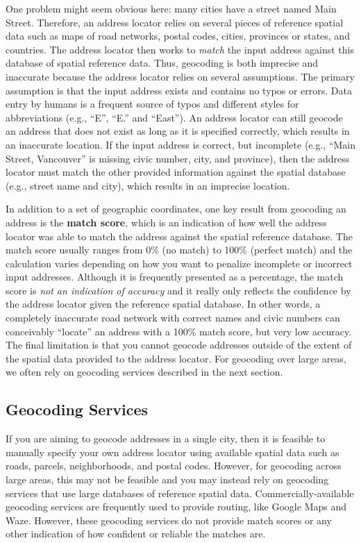 \documentclass[
]{book}
\begin{document}
One problem might seem obvious here: many cities have a street named Main Street. Therefore, an address locator relies on several pieces of reference spatial data such as maps of road networks, postal codes, cities, provinces or states, and countries. The address locator then works to \emph{match} the input address against this database of spatial reference data. Thus, geocoding is both imprecise and inaccurate because the address locator relies on several assumptions. The primary assumption is that the input address exists and contains no typos or errors. Data entry by humans is a frequent source of typos and different styles for abbreviations (e.g., ``E'', ``E.'' and ``East''). An address locator can still geocode an address that does not exist as long as it is specified correctly, which results in an inaccurate location. If the input address is correct, but incomplete (e.g., ``Main Street, Vancouver'' is missing civic number, city, and province), then the address locator must match the other provided information against the spatial database (e.g., street name and city), which results in an imprecise location.

In addition to a set of geographic coordinates, one key result from geocoding an address is the \textbf{match score}, which is an indication of how well the address locator was able to match the address against the spatial reference database. The match score usually ranges from 0\% (no match) to 100\% (perfect match) and the calculation varies depending on how you want to penalize incomplete or incorrect input addresses. Although it is frequently presented as a percentage, the match score is \emph{not an indication of accuracy} and it really only reflects the confidence by the address locator given the reference spatial database. In other words, a completely inaccurate road network with correct names and civic numbers can conceivably ``locate'' an address with a 100\% match score, but very low accuracy. The final limitation is that you cannot geocode addresses outside of the extent of the spatial data provided to the address locator. For geocoding over large areas, we often rely on geocoding services described in the next section.

\hypertarget{geocoding-services}{%
\subsection{Geocoding Services}\label{geocoding-services}}

If you are aiming to geocode addresses in a single city, then it is feasible to manually specify your own address locator using available spatial data such as roads, parcels, neighborhoods, and postal codes. However, for geocoding across large areas, this may not be feasible and you may instead rely on geocoding services that use large databases of reference spatial data. Commercially-available geocoding services are frequently used to provide routing, like Google Maps and Waze. However, these geocoding services do not provide match scores or any other indication of how confident or reliable the matches are.
\end{document}
